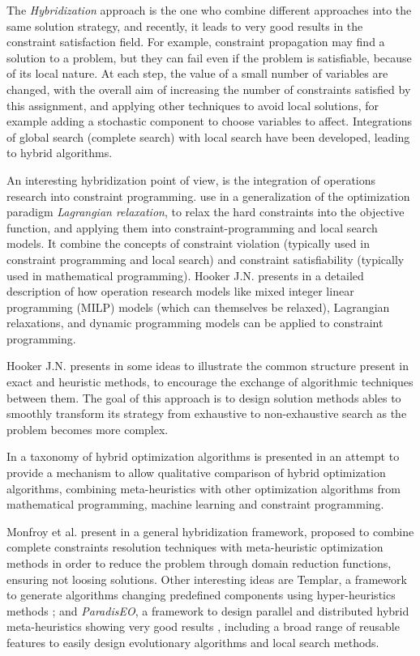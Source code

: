 The \textit{Hybridization} approach is the one who combine different approaches into the same solution strategy, and recently, it leads to very good results in the constraint satisfaction field. For example, constraint propagation may find a solution to a problem, but they can fail even if the problem is satisfiable, because of its local nature. At each step, the value of a small number of variables are changed, with the overall aim of increasing the number of constraints satisfied by this assignment, and applying other techniques to avoid local solutions, for example adding a stochastic component to choose variables to affect. Integrations of global search (complete search) with local search have been developed, leading to hybrid algorithms. 


An interesting hybridization point of view, is the integration of operations research into constraint programming.  use in \cite{Fontaine2014} a generalization of the optimization paradigm \textit{Lagrangian relaxation}, to relax the hard constraints into the objective function, and applying them into constraint-programming and local search models. It combine the concepts of constraint violation (typically used in constraint programming and local search) and constraint satisfiability (typically used in mathematical programming). Hooker J.N. presents in \cite{Hooker2006} a detailed description of how operation research models like mixed integer linear programming (MILP) models (which can themselves be relaxed), Lagrangian relaxations, and dynamic programming models can be applied to constraint programming. 

Hooker J.N. presents in \cite{Hooker2012} some ideas to illustrate the common structure present in exact and heuristic methods, to encourage the exchange of algorithmic techniques between them. The goal of this approach is to design solution methods ables to smoothly transform its strategy from exhaustive to non-exhaustive search as the problem becomes more complex.

In \cite{El-Ghazali2013} a taxonomy of hybrid optimization algorithms is presented in an attempt to provide a mechanism to allow qualitative comparison of hybrid optimization algorithms, combining meta-heuristics with other optimization algorithms from mathematical programming, machine learning and constraint programming.

Monfroy et al. present in \cite{Monfroya,Monfroyb} a general hybridization framework, proposed to combine complete constraints resolution techniques with meta-heuristic optimization methods in order to reduce the problem through domain reduction functions, ensuring not loosing solutions. Other interesting ideas are {\sc Templar}, a framework to generate algorithms changing predefined components using hyper-heuristics methods \cite{Swan2015}; and {\it ParadisEO}, a framework to design parallel and distributed hybrid meta-heuristics showing very good results \cite{Cahon2004}, including a broad range of reusable features to easily design evolutionary algorithms and local search methods.

